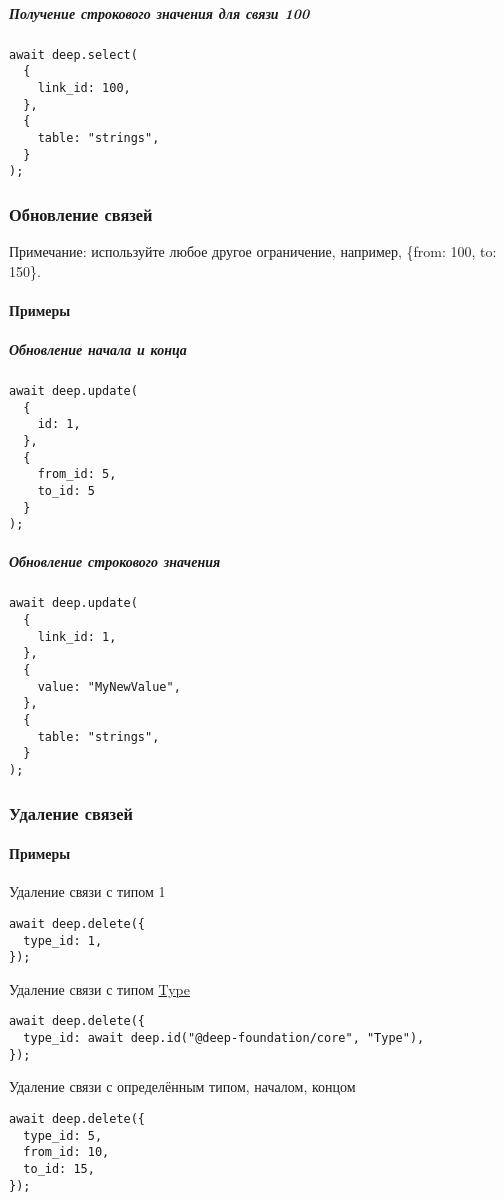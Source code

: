 \documentclass{article}
\begin{document}
\subparagraph{Получение строкового значения для связи 100}
\begin{lstlisting}
await deep.select(
  {
    link_id: 100,
  },
  {
    table: "strings",
  }
);
\end{lstlisting}

\subsubsection{Обновление связей}

Примечание: используйте любое другое ограничение, например, \{from: 100, to:
150\}.

\paragraph{Примеры}

\subparagraph{Обновление начала и конца}
\begin{lstlisting}
await deep.update(
  {
    id: 1,
  },
  {
    from_id: 5,
    to_id: 5
  }
);
\end{lstlisting}

\subparagraph{Обновление строкового значения}
\begin{lstlisting}
await deep.update(
  {
    link_id: 1,
  },
  {
    value: "MyNewValue",
  },
  {
    table: "strings",
  }
);
\end{lstlisting}

\subsubsection{Удаление связей}

\paragraph{Примеры \\}

Удаление связи с типом 1

\begin{lstlisting}
await deep.delete({
  type_id: 1,
});
\end{lstlisting}

Удаление связи с типом \hyperlink{type.Def}{Type}

\begin{lstlisting}
await deep.delete({
  type_id: await deep.id("@deep-foundation/core", "Type"),
});
\end{lstlisting}

Удаление связи с определённым типом, началом, концом
\begin{lstlisting}
await deep.delete({
  type_id: 5,
  from_id: 10,
  to_id: 15,
});
\end{lstlisting}
\end{document}
